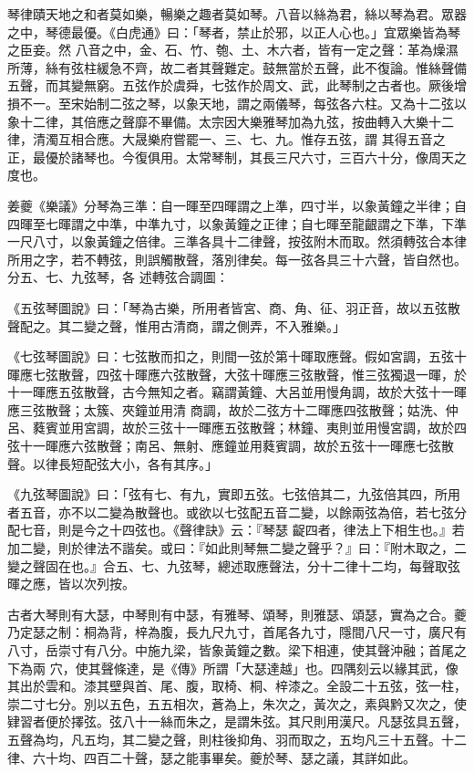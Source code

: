 \begin{pinyinscope}
 琴律賾天地之和者莫如樂，暢樂之趣者莫如琴。八音以絲為君，絲以琴為君。眾器之中，琴德最優。《白虎通》曰：「琴者，禁止於邪，以正人心也。」宜眾樂皆為琴之臣妾。然
 八音之中，金、石、竹、匏、土、木六者，皆有一定之聲：革為燥濕所薄，絲有弦柱緩急不齊，故二者其聲難定。鼓無當於五聲，此不復論。惟絲聲備五聲，而其變無窮。五弦作於虞舜，七弦作於周文、武，此琴制之古者也。厥後增損不一。至宋始制二弦之琴，以象天地，謂之兩儀琴，每弦各六柱。又為十二弦以象十二律，其倍應之聲靡不畢備。太宗因大樂雅琴加為九弦，按曲轉入大樂十二律，清濁互相合應。大晟樂府嘗罷一、三、七、九。惟存五弦，謂
 其得五音之正，最優於諸琴也。今復俱用。太常琴制，其長三尺六寸，三百六十分，像周天之度也。



 姜夔《樂議》分琴為三準：自一暉至四暉謂之上準，四寸半，以象黃鐘之半律；自四暉至七暉謂之中準，中準九寸，以象黃鐘之正律；自七暉至龍齦謂之下準，下準一尺八寸，以象黃鐘之倍律。三準各具十二律聲，按弦附木而取。然須轉弦合本律所用之字，若不轉弦，則誤觸散聲，落別律矣。每一弦各具三十六聲，皆自然也。分五、七、九弦琴，各
 述轉弦合調圖：



 《五弦琴圖說》曰：「琴為古樂，所用者皆宮、商、角、征、羽正音，故以五弦散聲配之。其二變之聲，惟用古清商，謂之側弄，不入雅樂。」



 《七弦琴圖說》曰：七弦散而扣之，則間一弦於第十暉取應聲。假如宮調，五弦十暉應七弦散聲，四弦十暉應六弦散聲，大弦十暉應三弦散聲，惟三弦獨退一暉，於十一暉應五弦散聲，古今無知之者。竊謂黃鐘、大呂並用慢角調，故於大弦十一暉應三弦散聲；太簇、夾鐘並用清
 商調，故於二弦方十二暉應四弦散聲；姑洗、仲呂、蕤賓並用宮調，故於三弦十一暉應五弦散聲；林鐘、夷則並用慢宮調，故於四弦十一暉應六弦散聲；南呂、無射、應鐘並用蕤賓調，故於五弦十一暉應七弦散聲。以律長短配弦大小，各有其序。」



 《九弦琴圖說》曰：「弦有七、有九，實即五弦。七弦倍其二，九弦倍其四，所用者五音，亦不以二變為散聲也。或欲以七弦配五音二變，以餘兩弦為倍，若七弦分配七音，則是今之十四弦也。《聲律訣》云：『琴瑟
 齪四者，律法上下相生也。』若加二變，則於律法不諧矣。或曰：『如此則琴無二變之聲乎？』曰：『附木取之，二變之聲固在也。』合五、七、九弦琴，總述取應聲法，分十二律十二均，每聲取弦暉之應，皆以次列按。



 古者大琴則有大瑟，中琴則有中瑟，有雅琴、頌琴，則雅瑟、頌瑟，實為之合。夔乃定瑟之制：桐為背，梓為腹，長九尺九寸，首尾各九寸，隱間八尺一寸，廣尺有八寸，岳崇寸有八分。中施九梁，皆象黃鐘之數。梁下相連，使其聲沖融；首尾之下為兩
 穴，使其聲條達，是《傳》所謂「大瑟達越」也。四隅刻云以緣其武，像其出於雲和。漆其壁與首、尾、腹，取椅、桐、梓漆之。全設二十五弦，弦一柱，崇二寸七分。別以五色，五五相次，蒼為上，朱次之，黃次之，素與黔又次之，使肄習者便於擇弦。弦八十一絲而朱之，是謂朱弦。其尺則用漢尺。凡瑟弦具五聲，五聲為均，凡五均，其二變之聲，則柱後抑角、羽而取之，五均凡三十五聲。十二律、六十均、四百二十聲，瑟之能事畢矣。夔於琴、瑟之議，其詳如此。




\end{pinyinscope}
